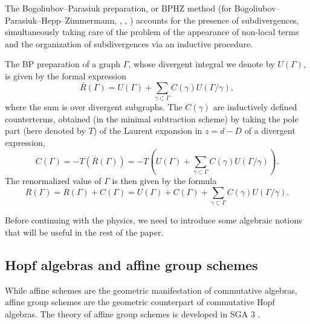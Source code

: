 \documentclass[10pt]{amsart}
\def\g{\gamma}
\def\G{\Gamma}
\def\sbs{\subset}
\numberwithin{equation}{section}
\begin{document}
The Bogoliubov--Parasiuk  preparation, or BPHZ method (for
Bogoliubov--Parasiuk--Hepp--Zimmermann, \cite{BP}, \cite{Hepp},
\cite{Zi}) accounts for the presence of subdivergences,
simultaneously taking care of the problem of the appearance of
non-local terms and the organization of subdivergences via an inductive
procedure.

\smallskip

The BP preparation of a graph $\Gamma$, whose divergent integral we
denote by $U(\Gamma)$, is given by the formal expression
\begin{equation}\label{BPprep}
\overline{R}( \G) = U(\G) + \sum_{\g \sbs \G} C(\g) U( \G / \g),
\end{equation}
where the sum is over divergent subgraphs. The $C(\g)$ are inductively
defined counterterms, obtained (in the minimal subtraction scheme)
by taking the pole part (here denoted by $T$) of the Laurent expansion
in $z=d-D$ of a divergent expression,
\begin{equation}\label{counter}
C(\G) =  -T(\overline{R}( \G)) = -T\left(U(\G) + \sum_{\g \sbs \G}
 C(\g) U( \G /
 \g)\right).
\end{equation}
The renormalized value of $\Gamma$ is then given by the formula
\begin{equation}\label{Rgamma}
R(\G) =  \overline{R}( \G) +C(\G) =U(\G)  +C(\G) + \sum_{\g \sbs \G}
 C(\g) U( \G /
 \g).
\end{equation}

\smallskip

Before continuing with the physics, we need to introduce some
algebraic notions that will be useful in the rest of the paper.


\medskip
\subsection*{Hopf algebras and affine group schemes}\hfill\medskip

While affine schemes are the geometric manifestation of commutative
algebras, affine group schemes are the geometric counterpart of commutative
Hopf algebras. The theory of affine group schemes is developed in SGA
3 \cite{SGA3}.

\smallskip
\end{document}
